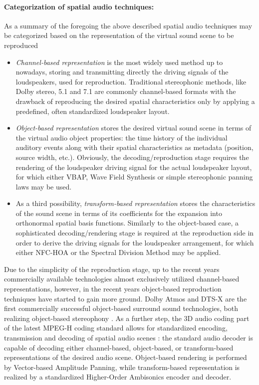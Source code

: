 \paragraph{Categorization of spatial audio techniques:}
As a summary of the foregoing the above described spatial audio techniques may be categorized based on the representation of the virtual sound scene to be reproduced \cite{Spors2013:Survey}
\begin{itemize}
\item \emph{Channel-based representation} is the most widely used method up to nowadays, storing and transmitting directly the driving signals of the loudspeakers, used for reproduction.
Traditional stereophonic methods, like Dolby stereo, 5.1 and 7.1 are commonly channel-based formats with the drawback of reproducing the desired spatial characteristics only by applying a predefined, often standardized loudspeaker layout.
%
\item \emph{Object-based representation} stores the desired virtual sound scene in terms of the virtual audio object properties: the time history of the individual auditory events along with their spatial characteristics as metadata (position, source width, etc.).
Obviously, the decoding/reproduction stage requires the rendering of the loudspeaker driving signal for the actual loudspeaker layout, for which either VBAP, Wave Field Synthesis or simple stereophonic panning laws may be used.
%
\item As a third possibility, \emph{transform-based representation} stores the characteristics of the sound scene in terms of its coefficients for the expansion into  orthonormal spatial basis functions.
Similarly to the object-based case, a sophisticated decoding/rendering stage is required at the reproduction side in order to derive the driving signals for the loudspeaker arrangement, for which either NFC-HOA or the Spectral Division Method may be applied.
\end{itemize}

Due to the simplicity of the reproduction stage, up to the recent years commercially available technologies almost exclusively utilized channel-based representations,
however, in the recent years object-based reproduction techniques have started to gain more ground.
Dolby Atmos and DTS-X are the first commercially successful object-based surround sound technologies, both realizing object-based stereophony \cite{Atmos}.
As a further step, the 3D audio coding part of the latest MPEG-H coding standard allows for standardized encoding, transmission and decoding of spatial audio scenes \cite{herre2015mpeg, 7056445}:
the standard audio decoder is capable of decoding either channel-based, object-based, or transform-based representations of the desired audio scene.
Object-based rendering is performed by Vector-based Amplitude Panning, while transform-based representation is realized by a standardized Higher-Order Ambisonics encoder and decoder.

